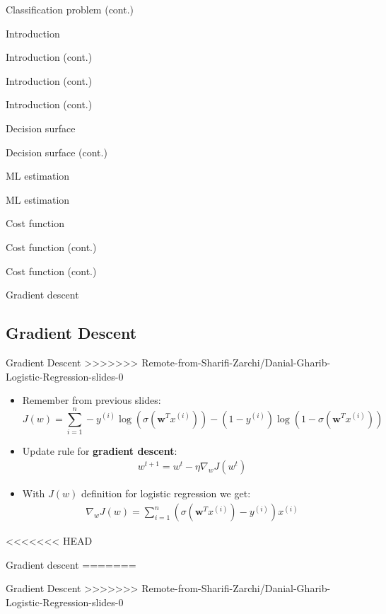 \documentclass[serif, aspectratio=169]{beamer}
\begin{document}
\begin{frame}{Classification problem (cont.)}
\begin{itemize}
\begin{frame}{Introduction}
\begin{itemize}
\begin{frame}{Introduction (cont.)}
\begin{frame}{Introduction (cont.)}
\begin{frame}{Introduction (cont.)}
\begin{frame}{Decision surface}
\begin{itemize}
\begin{frame}{Decision surface (cont.)}
\begin{frame}{ML estimation}
\begin{frame}{ML estimation}
\begin{itemize}
\begin{frame}{Cost function}
\begin{frame}{Cost function (cont.)}
\begin{itemize}
\begin{itemize}
\begin{frame}{Cost function (cont.)}
\begin{frame}{Gradient descent}
\subsection{Gradient Descent}
\begin{frame}{Gradient Descent}
>>>>>>> Remote-from-Sharifi-Zarchi/Danial-Gharib-Logistic-Regression-slides-0
    \begin{itemize}
    \item Remember from previous slides:
        \[
        J(w) = \sum_{i=1}^{n}-y^{(i)}\log (\sigma (\mathbf{w}^T x^{(i)})) - 
            (1-y^{(i)})\log (1 - \sigma (\mathbf{w}^T x^{(i)}))
        \]
    \item Update rule for \textbf{gradient descent}: 
        \begin{align*}
            w^{t+1} = w^t - \eta \nabla _w J(w^t)
        \end{align*}
    \item With $J(w)$ definition for logistic regression we get:
        \begin{align*}
            \nabla _w J(w) = \sum_{i=1}^{n} (\sigma (\mathbf{w}^T x^{(i)}) - y^{(i)})x^{(i)} 
        \end{align*}
        
    \end{itemize}
\end{frame}
<<<<<<< HEAD
\begin{frame}{Gradient descent}
=======
\begin{frame}{Gradient Descent}
>>>>>>> Remote-from-Sharifi-Zarchi/Danial-Gharib-Logistic-Regression-slides-0
    \begin{itemize}
    

\end{itemize}
\end{frame}
\end{frame}
\end{frame}
\end{frame}
\end{itemize}
\end{itemize}
\end{frame}
\end{frame}
\end{itemize}
\end{frame}
\end{frame}
\end{frame}
\end{itemize}
\end{frame}
\end{frame}
\end{frame}
\end{frame}
\end{itemize}
\end{frame}
\end{itemize}
\end{frame}
\end{document}
